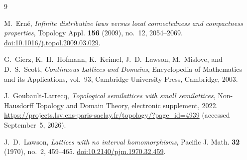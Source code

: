 \documentclass[11pt]{amsart}
\theoremstyle{definition}
\theoremstyle{remark}
\numberwithin{equation}{section}
\begin{document}
\begin{thebibliography}{9}

M.~Ern\'e,
\emph{Infinite distributive laws versus local connectedness and
compactness properties},
Topology Appl. \textbf{156} (2009), no.~12, 2054--2069.
\href{https://doi.org/10.1016/j.topol.2009.03.029}
{doi:10.1016/j.topol.2009.03.029}.

G.~Gierz, K.~H.~Hofmann, K.~Keimel, J.~D.~Lawson,
M.~Mislove, and D.~S.~Scott,
\emph{Continuous Lattices and Domains},
Encyclopedia of Mathematics and its Applications, vol.~93,
Cambridge University Press, Cambridge, 2003.

J.~Goubault-Larrecq,
\emph{Topological semilattices with small semilattices},
Non-Hausdorff Topology and Domain Theory, electronic supplement,
2022.
\url{https://projects.lsv.ens-paris-saclay.fr/topology/?page_id=4939}
(accessed September~5, 2026).

J.~D.~Lawson,
\emph{Lattices with no interval homomorphisms},
Pacific J. Math. \textbf{32} (1970), no.~2, 459--465.
\href{https://doi.org/10.2140/pjm.1970.32.459}
{doi:10.2140/pjm.1970.32.459}.

\end{thebibliography}
\end{document}
